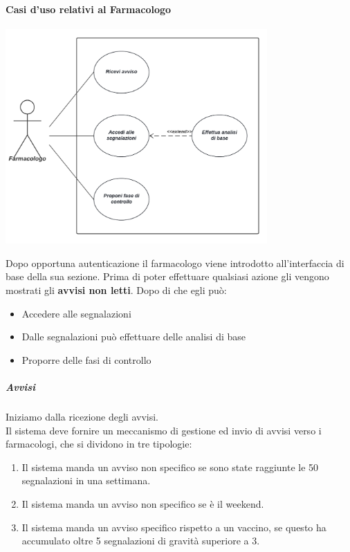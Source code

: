 \documentclass{article}
\begin{document}
    \paragraph*{Casi d'uso relativi al Farmacologo}
            \begin{center}
                \includegraphics[width=0.75\textwidth]{pictures/CasoDUsoFarmacologo.png}
            \end{center}
        Dopo opportuna autenticazione il farmacologo viene introdotto all'interfaccia di base della sua sezione. Prima di poter effettuare qualsiasi azione gli vengono mostrati gli \textbf{avvisi non letti}. Dopo di che egli può:
            \begin{itemize}
                \item Accedere alle segnalazioni
                \item Dalle segnalazioni può effettuare delle analisi di base
                \item Proporre delle fasi di controllo
            \end{itemize}
        \subparagraph*{Avvisi}
            Iniziamo dalla ricezione degli avvisi.\\
            Il sistema deve fornire un meccanismo di gestione ed invio di avvisi verso i
            farmacologi, che si dividono in tre tipologie:
                \begin{enumerate}
                    \item Il sistema manda un avviso non specifico se sono state raggiunte le 50 segnalazioni in una settimana.
                    \item Il sistema manda un avviso non specifico se è il weekend.
                    \item Il sistema manda un avviso specifico rispetto a un vaccino, se questo ha accumulato oltre 5 segnalazioni di gravità superiore a 3.
                \end{enumerate}
\end{document}
